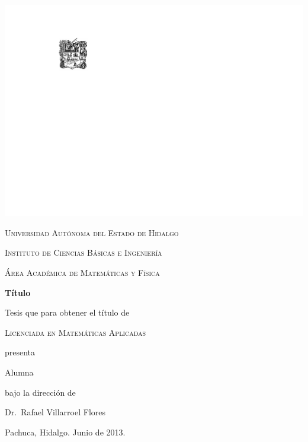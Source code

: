\documentclass[12pt]{book}
\theoremstyle{definition}
\newcounter{in}
\newcommand{\elespacio}{1.4cm}
\begin{document}
\mainmatter 
\begin{titlepage}
  \begin{center}
    \null
    \vspace*{\fill}

    \includegraphics[scale=1.2,bb=55 20 0 0]{escudouaeh.pdf}

    \vspace*{\elespacio}

    \textsc{Universidad Autónoma del Estado de Hidalgo}

    \textsc{Instituto de Ciencias Básicas e Ingeniería}

    \textsc{Área Académica de Matemáticas y Física}

    \vspace*{\elespacio}

    {\Huge\bfseries Título\par}

    \vspace*{\elespacio}

    {\large Tesis que para obtener el título de}

    \vspace*{\elespacio}

    {\Large\textsc{Licenciada en Matemáticas Aplicadas}}

    \vspace*{\elespacio}

    {\large presenta}

    \vspace*{\elespacio}

    {\Huge Alumna}

    \vspace*{\elespacio}

    {\large bajo la dirección de}

    \bigskip

    {\Large Dr.~Rafael Villarroel Flores}

    \bigskip

    {Pachuca, Hidalgo. Junio de 2013.}

    \vspace*{\fill}

  \end{center}
\end{titlepage}
\end{document}
